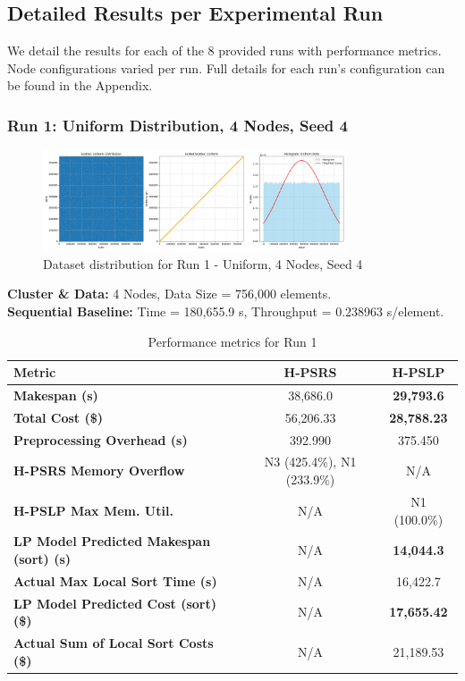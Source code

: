 \documentclass[]{interact}
\theoremstyle{plain}
\theoremstyle{definition}
\theoremstyle{remark}
\begin{document}
\subsection{Detailed Results per Experimental Run}
\label{sec:detailed_results}

We detail the results for each of the 8 provided runs with performance metrics. Node configurations varied per run. Full details for each run's configuration can be found in the Appendix.

\subsubsection{Run 1: Uniform Distribution, 4 Nodes, Seed 4}

\begin{figure}[H]
    \centering
    \includegraphics[width=0.8\textwidth]{src/out/1run_4node_4seed_uniform.png}
    \caption{Dataset distribution for Run 1 - Uniform, 4 Nodes, Seed 4}
    \label{fig:run1_dist}
\end{figure}

\textbf{Cluster \& Data:} 4 Nodes, Data Size = 756,000 elements.\\
\textbf{Sequential Baseline:} Time = 180,655.9 \textmu{}s, Throughput = 0.238963 \textmu{}s/element.

\begin{table}[H]
\centering
\caption{Performance metrics for Run 1}
\label{tab:run1}
\begin{tabular}{@{}lcc@{}}
\toprule
\textbf{Metric} & \textbf{H-PSRS} & \textbf{H-PSLP} \\
\midrule
\textbf{Makespan (\textmu{}s)} & 38,686.0 & \textbf{29,793.6} \\
\textbf{Total Cost (\$)} & 56,206.33 & \textbf{28,788.23} \\
\textbf{Preprocessing Overhead (\textmu{}s)} & 392.990 & 375.450 \\
\textbf{H-PSRS Memory Overflow} & N3 (425.4\%), N1 (233.9\%) & N/A \\
\textbf{H-PSLP Max Mem. Util.} & N/A & N1 (100.0\%) \\
\textbf{LP Model Predicted Makespan (sort) (\textmu{}s)} & N/A & \textbf{14,044.3} \\
\textbf{Actual Max Local Sort Time (\textmu{}s)} & N/A & 16,422.7 \\
\textbf{LP Model Predicted Cost (sort) (\$)} & N/A & \textbf{17,655.42} \\
\textbf{Actual Sum of Local Sort Costs (\$)} & N/A & 21,189.53 \\
\bottomrule
\end{tabular}
\end{table}
\end{document}
